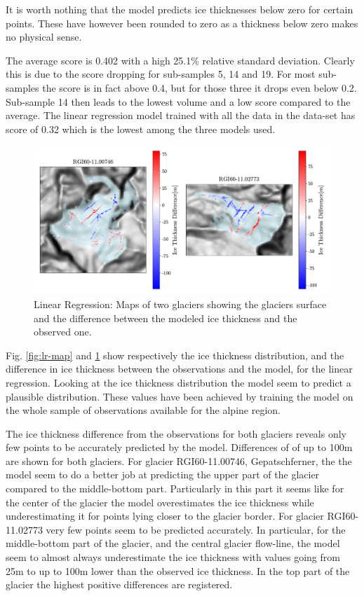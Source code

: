 It is worth nothing that the model predicts ice thicknesses below zero for certain points. These have however been rounded to zero as a thickness below zero makes no physical sense.

The average score is 0.402 with a high 25.1\% relative standard deviation. Clearly this is due to the score dropping for sub-samples 5, 14 and 19. For most sub-samples the score is in fact above 0.4, but for those three it drops even below 0.2. Sub-sample 14 then leads to the lowest volume and a low score compared to the average.
The linear regression model trained with all the data in the data-set has score of 0.32 which  is the lowest among the three models used.

\begin{figure}[!tp]
	\centering		  
	\includegraphics[width=1.\textwidth]{figures/LR_thick_diff_map.pdf}
	\caption{Linear Regression: Maps of two glaciers showing the glaciers surface and the difference between the modeled ice thickness and the  observed one.}
	\label{fig:lr-diff-map}
\end{figure}

Fig. \ref{fig:lr-map} and \ref{fig:lr-diff-map} show respectively the ice thickness distribution, and the difference in ice thickness between the observations and the model, for the linear regression. Looking at the ice thickness distribution the model seem to predict a plausible distribution. These values have been achieved by training the model on the whole sample of observations available for the alpine region.
 
The ice thickness difference from the observations for both glaciers reveals only few points to be accurately predicted by the model. Differences of of up to 100m are shown for both glaciers. For glacier RGI60-11.00746, Gepatschferner, the the model seem to do a better job at predicting the upper part of the glacier compared to the middle-bottom part. Particularly in this part it seems like for the center of the glacier the model overestimates the ice thickness while underestimating it for points lying closer to the glacier border. For glacier RGI60-11.02773 very few points seem to be predicted accurately. In particular, for the middle-bottom part of the glacier, and the central glacier flow-line, the model seem to almost always underestimate the ice thickness with values going from 25m to up to 100m lower than the observed ice thickness. In the top part of the glacier the highest positive differences are registered.

